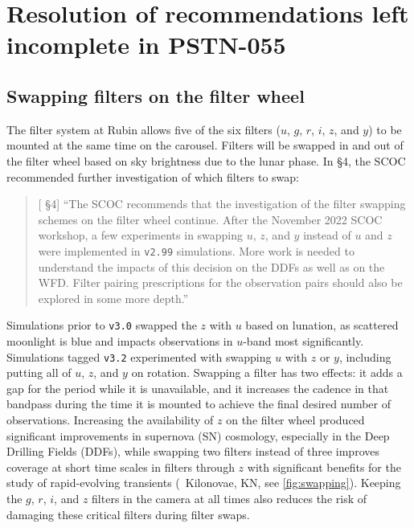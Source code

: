 
\clearpage

\section{Resolution of recommendations left incomplete in PSTN-055} \label{sec:openquestions}

\subsection{Swapping filters on the filter wheel}\label{sec:filterswap}
The filter system at Rubin allows five of the six filters ($u$, $g$, $r$, $i$, $z$, and $y$) to be mounted at the same time on the carousel. 
Filters will be swapped in and out of the filter wheel based on sky brightness due to the lunar phase. 
In  \S4, the SCOC recommended further investigation of which filters to swap: 
\begin{quote}
    {[ \S4] ``The SCOC recommends that the investigation of the filter swapping schemes on the filter wheel continue. After the November 2022 SCOC workshop, a few experiments in swapping $u$, $z$, and $y$ instead of $u$ and $z$ were implemented in \texttt{v2.99} simulations. More work is needed to understand the impacts of this decision on the DDFs as well as on the WFD. Filter pairing prescriptions for the observation pairs should also be explored in some more depth.''}
\end{quote}

 Simulations prior to \texttt{v3.0} swapped the $z$ with $u$ based on lunation, as scattered moonlight is blue and impacts observations in $u$-band most significantly. Simulations tagged \texttt{v3.2}  experimented with  swapping $u$ with $z$ or $y$, including putting all of $u$, $z$, and $y$ on rotation. Swapping a filter has two effects: it adds a gap for the period while it is unavailable, and it increases the cadence in that bandpass during the time it is mounted to achieve the final desired number of observations. Increasing the availability of $z$ on the filter wheel produced significant improvements in supernova (SN) cosmology, especially in the Deep Drilling Fields (DDFs), while swapping two filters instead of three improves coverage at short time scales in filters through $z$ with significant benefits for the study of rapid-evolving transients (\eg\ Kilonovae, KN, see \autoref{fig:swapping}). Keeping the $g$, $r$, $i$, and $z$ filters in the camera at all times also reduces the risk of damaging these critical filters during filter swaps.
 

